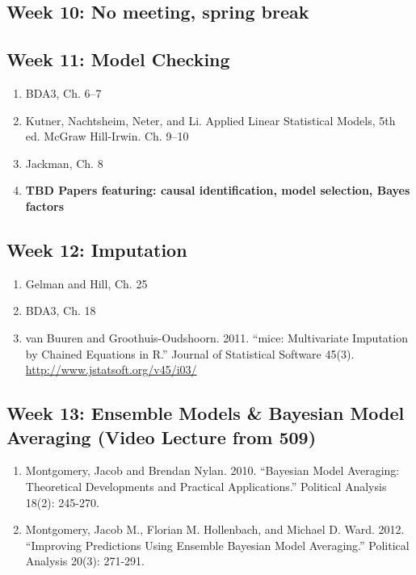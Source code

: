 \documentclass[11pt, leqno, fleqn]{article}
\begin{document}
\subsection*{Week 10: No meeting, spring break}
\subsection*{Week 11: Model Checking}
	\begin{enumerate}
	\item[] BDA3, Ch. 6--7
	\item[] Kutner, Nachtsheim, Neter, and Li. Applied Linear Statistical Models, 5th ed.
McGraw Hill-Irwin. Ch. 9--10
	\item[] Jackman, Ch. 8
	\item[] {\bf TBD Papers featuring: causal identification, model selection, Bayes factors }
	\end{enumerate}
\subsection*{Week 12: Imputation}
	\begin{enumerate}
	\item[] Gelman and Hill, Ch. 25
	\item[] BDA3, Ch. 18
	\item[] van Buuren and Groothuis-Oudshoorn. 2011. ``mice: Multivariate Imputation
by Chained Equations in R.'' Journal of Statistical Software 45(3). \url{http://www.jstatsoft.org/v45/i03/}
	\end{enumerate}
\subsection*{Week 13: Ensemble Models \& Bayesian Model Averaging (Video Lecture from 509)}
	\begin{enumerate}
		\item[] Montgomery, Jacob and Brendan Nylan. 2010. ``Bayesian Model Averaging:
 Theoretical Developments and Practical Applications.'' Political Analysis 18(2):
 245-270.
 	\item[] Montgomery, Jacob M., Florian M. Hollenbach, and Michael D. Ward. 2012.
``Improving Predictions Using Ensemble Bayesian Model Averaging.''
Political Analysis 20(3): 271-291.
	\end{enumerate}
\end{document}
